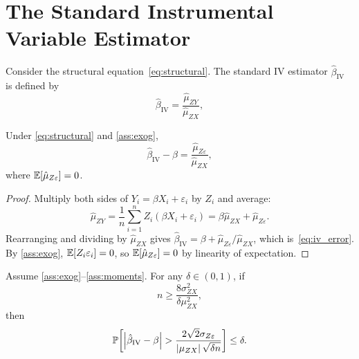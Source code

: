 \section{The Standard Instrumental Variable Estimator}
\label{sec:standard_iv}

\begin{definition}
    Consider the structural equation~\eqref{eq:structural}. The standard IV estimator
    $\hat{\beta}_{\mathrm{IV}}$ is defined by
    \[
        \hat{\beta}_{\mathrm{IV}} = \frac{\hat{\mu}_{ZY}}{\hat{\mu}_{ZX}},
    \]
\end{definition}

\begin{lemma}
    \label{lem:iv_decomp}
    Under \eqref{eq:structural} and \ref{ass:exog},
    \begin{equation}
    \label{eq:iv_error}
        \hat{\beta}_{\mathrm{IV}} - \beta = \frac{\hat{\mu}_{Z\varepsilon}}{\hat{\mu}_{ZX}},
    \end{equation}
    where $\operatorname{\mathbb{E}}[\hat{\mu}_{Z\varepsilon}] = 0$.
\end{lemma}

\begin{proof}
    Multiply both sides of $Y_i = \beta X_i + \varepsilon_i$ by $Z_i$ and average:
    \[
        \hat{\mu}_{ZY}
        = \frac{1}{n}\sum_{i=1}^{n}Z_i(\beta X_i + \varepsilon_i)
        = \beta\hat{\mu}_{ZX} + \hat{\mu}_{Z\varepsilon}.
    \]
    Rearranging and dividing by $\hat{\mu}_{ZX}$ gives $\hat{\beta}_{\mathrm{IV}} = \beta + \hat{\mu}_{Z\varepsilon}/\hat{\mu}_{ZX}$, which is~\eqref{eq:iv_error}. By \ref{ass:exog}, $\operatorname{\mathbb{E}}[Z_i\varepsilon_i] = 0$, so $\operatorname{\mathbb{E}}[\hat{\mu}_{Z\varepsilon}] = 0$ by linearity of expectation.
\end{proof}

\begin{theorem}
\label{thm:iv}
    Assume \ref{ass:exog}--\ref{ass:moments}. For any $\delta \in (0,1)$, if
    \begin{equation}
        \label{eq:iv_strength}
            n \geq \frac{8\sigma_{ZX}^2}{\delta \mu_{ZX}^2},
    \end{equation}
    then
    \begin{equation}
    \label{eq:iv_bound}
        \operatorname{\mathbb{P}}\!\left[\left|\hat{\beta}_{\mathrm{IV}} - \beta\right|
            > \frac{2\sqrt{2}\sigma_{Z\varepsilon}}{\left|\mu_{ZX}\right|\sqrt{\delta n}}
            \right] \leq \delta.
    \end{equation}
\end{theorem}

